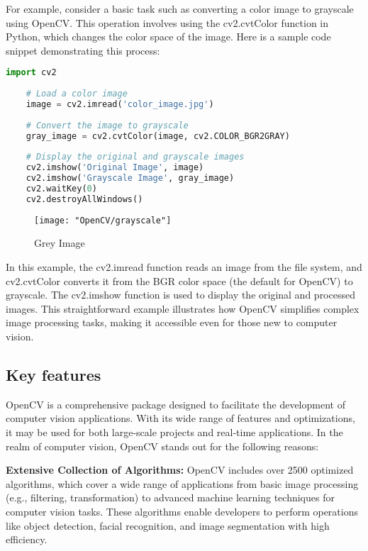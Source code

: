 For example, consider a basic task such as converting a color image to grayscale using OpenCV. This operation involves using the cv2.cvtColor function in Python, which changes the color space of the image. Here is a sample code snippet demonstrating this process:

\begin{lstlisting}[language=Python, caption=Converting a color image to grayscale using OpenCV]
	import cv2
	
	# Load a color image
	image = cv2.imread('color_image.jpg')
	
	# Convert the image to grayscale
	gray_image = cv2.cvtColor(image, cv2.COLOR_BGR2GRAY)
	
	# Display the original and grayscale images
	cv2.imshow('Original Image', image)
	cv2.imshow('Grayscale Image', gray_image)
	cv2.waitKey(0)
	cv2.destroyAllWindows()
\end{lstlisting}

\begin{figure}[h]
	\centering
	\texttt{[image: "OpenCV/grayscale"]}
	\caption{Grey Image}\label{grayscale}
\end{figure}

In this example, the cv2.imread function reads an image from the file system, and cv2.cvtColor converts it from the BGR color space (the default for OpenCV) to grayscale. The cv2.imshow function is used to display the original and processed images. This straightforward example illustrates how OpenCV simplifies complex image processing tasks, making it accessible even for those new to computer vision.\cite{OpenCVTeam:2024}

\subsection{Key features}
OpenCV is a comprehensive package designed to facilitate the development of computer vision applications. With its wide range of features and optimizations, it may be used for both large-scale projects and real-time applications. In the realm of computer vision, OpenCV stands out for the following reasons:

\textbf{Extensive Collection of Algorithms:} OpenCV includes over 2500 optimized algorithms, which cover a wide range of applications from basic image processing (e.g., filtering, transformation) to advanced machine learning techniques for computer vision tasks. These algorithms enable developers to perform operations like object detection, facial recognition, and image segmentation with high efficiency.

